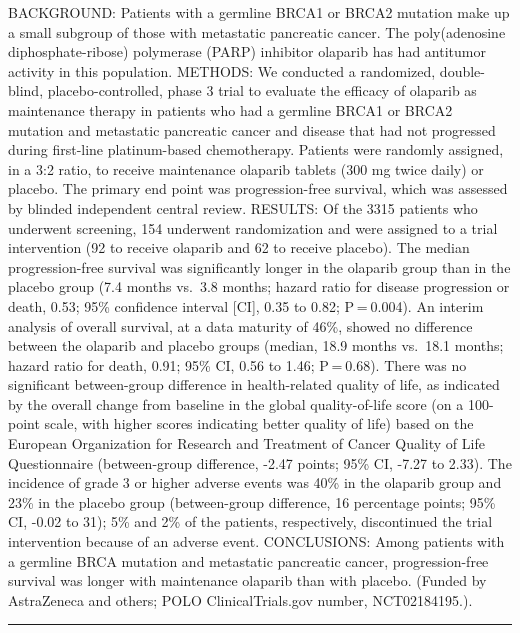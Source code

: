 \documentclass[]{article}
\begin{document}
BACKGROUND: Patients with a germline BRCA1 or BRCA2 mutation make up a
small subgroup of those with metastatic pancreatic cancer. The
poly(adenosine diphosphate-ribose) polymerase (PARP) inhibitor olaparib
has had antitumor activity in this population. METHODS: We conducted a
randomized, double-blind, placebo-controlled, phase 3 trial to evaluate
the efficacy of olaparib as maintenance therapy in patients who had a
germline BRCA1 or BRCA2 mutation and metastatic pancreatic cancer and
disease that had not progressed during first-line platinum-based
chemotherapy. Patients were randomly assigned, in a 3:2 ratio, to
receive maintenance olaparib tablets (300 mg twice daily) or placebo.
The primary end point was progression-free survival, which was assessed
by blinded independent central review. RESULTS: Of the 3315 patients who
underwent screening, 154 underwent randomization and were assigned to a
trial intervention (92 to receive olaparib and 62 to receive placebo).
The median progression-free survival was significantly longer in the
olaparib group than in the placebo group (7.4 months vs.~3.8 months;
hazard ratio for disease progression or death, 0.53; 95\% confidence
interval {[}CI{]}, 0.35 to 0.82; P = 0.004). An interim analysis of
overall survival, at a data maturity of 46\%, showed no difference
between the olaparib and placebo groups (median, 18.9 months vs.~18.1
months; hazard ratio for death, 0.91; 95\% CI, 0.56 to 1.46; P = 0.68).
There was no significant between-group difference in health-related
quality of life, as indicated by the overall change from baseline in the
global quality-of-life score (on a 100-point scale, with higher scores
indicating better quality of life) based on the European Organization
for Research and Treatment of Cancer Quality of Life Questionnaire
(between-group difference, -2.47 points; 95\% CI, -7.27 to 2.33). The
incidence of grade 3 or higher adverse events was 40\% in the olaparib
group and 23\% in the placebo group (between-group difference, 16
percentage points; 95\% CI, -0.02 to 31); 5\% and 2\% of the patients,
respectively, discontinued the trial intervention because of an adverse
event. CONCLUSIONS: Among patients with a germline BRCA mutation and
metastatic pancreatic cancer, progression-free survival was longer with
maintenance olaparib than with placebo. (Funded by AstraZeneca and
others; POLO ClinicalTrials.gov number, NCT02184195.).

{}

{}

\begin{center}\rule{0.5\linewidth}{\linethickness}\end{center}
\end{document}
